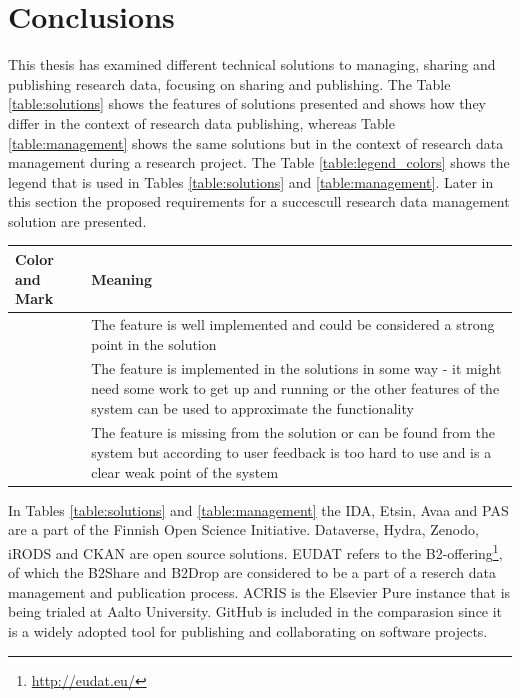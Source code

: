 \chapter{Conclusions}
\label{chapter:conclusions}

This thesis has examined different technical solutions to managing, sharing and
publishing research data, focusing on sharing and publishing. The Table
\ref{table:solutions} shows the features of solutions presented and shows
how they differ in the context of research data publishing, whereas Table
\ref{table:management} shows the same solutions but in the context of research
data management during a research project. The Table
\ref{table:legend_colors} shows the legend that is used in Tables
\ref{table:solutions} and \ref{table:management}. Later in this section the
proposed requirements for a succescull research data management solution
are presented.

\label{table:legend_colors}
    \begin{tabularx}{\textwidth}{| >{\raggedright}p{3cm} | X |}
    \hline
    \textbf{Color and Mark} & \textbf{Meaning} \\
    \hline
    \multicolumn{1}{|c|}{\cellcolor{green}++} & The feature is well implemented and could be considered a strong point
                          in the solution \\
    \hline
    \multicolumn{1}{|c|}{\cellcolor{yellow}+} & The feature is implemented in the solutions in some way - it might need
                          some work to get up and running or the other features of the system can be used to
                          approximate the functionality \\
    \hline
    \multicolumn{1}{|c|}{\cellcolor{red}-}    & The feature is missing from the solution or can be found from the system but according
                          to user feedback is too hard to use and is a clear weak point of the system \\
    \hline
\end{tabularx}

In Tables \ref{table:solutions} and \ref{table:management} the IDA, Etsin, Avaa and PAS are a part of the
Finnish Open Science Initiative. Dataverse, Hydra, Zenodo, iRODS and CKAN are
open source solutions. EUDAT refers to the B2-offering\footnote{\url{http://eudat.eu/}},
of which the B2Share and B2Drop are considered to be a part of a reserch
data management and publication process. ACRIS is the Elsevier Pure instance
that is being trialed at Aalto University. GitHub is included in the
comparasion since it is a widely adopted tool for publishing and collaborating
on software projects.

